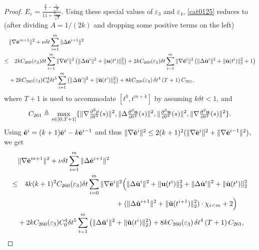\documentclass{article}
\theoremstyle{definition}                   %
\begin{document}
\begin{proof}
$E_\varepsilon= \frac{\frac{3}{4}-\frac{1}{\sqrt{2}}}{11+\frac{\nu_{\max}}{\sqrt{2}}}$.
Using these special values of $\varepsilon_3$ and $\varepsilon_4$, \eqref{cat0125} reduces to (after dividing $A=1/(2k)$ and dropping some positive terms on the left) 
\begin{align}
& \|\nabla\bar{\bf{e}}^{m+1}\|^2 
+ \nu\delta t \sum_{i=1}^m \|\Delta\bar{\bf{e}}^{i+1}\|^2
\notag\\
\le & \quad 2kC_{260}(\varepsilon_3) \delta t 
\sum_{i=1}^m \|\nabla\bar{\bf{e}}^i\|^2 
\left(\|\Delta\bar{\bf{u}}^i\|^2 + \|{\bf{u}}(t^i)\|^2_2 \right) 
+ 2k C_{260}(\varepsilon_3) \delta t 
\sum_{i=1}^m \|\nabla\tilde{\bf{e}}^i\|^2 
\left(\|\Delta\hat{\bf{u}}^i\|^2 + \|\hat{\bf{u}}(t^i)\|^2_2 + 1\right)
\notag\\
&+ 2k C_{260}(\varepsilon_3) C^4_0 \delta t^5 
\sum_{i=1}^m \left(\|\Delta\hat{\bf{u}}^i\|^2 + \|\hat{\bf{u}}(t^i)\|_2^2 \right) 
+ 8 k C_{260}(\varepsilon_3)\, \delta t^4 \,
(T+1)\,  C_{261},
\label{cat0126}
\end{align}
where $T+1$ is used to accommodate $[t^0, t^{m+k}]$ by assuming $k\delta t<1$, and 
\begin{align}
C_{261}\triangleq \max_{s\in [0,T+1]}\{
\|\nabla \tfrac{\partial^2 p}{\partial t^2}(s)\|^2,
\|\Delta \tfrac{\partial^2 \bf{u}}{\partial t^2}(s)\|^2, 
\|\tfrac{\partial^3 \bf{u}}{\partial t^3}(s)\|^2, 
\|\nabla \tfrac{\partial^2 \bf{u}}{\partial t^2}(s)\|^2\}.
\label{def_C261}
\end{align}
Using 
$\tilde{\bf e}^i=(k+1)\bar{\bf e}^i - k \bar{\bf e}^{i-1}$ and thus 
$\|\nabla\tilde{\bf{e}}^i\|^2 \le 2(k+1)^2 ( 
\|\nabla\bar{\bf{e}}^i\|^2 + \|\nabla\bar{\bf{e}}^{i-1}\|^2)$, 
we get
\begin{align}
& \|\nabla\bar{\bf{e}}^{m+1}\|^2 
+ \nu\delta t \sum_{i=1}^m \|\Delta\bar{\bf{e}}^{i+1}\|^2
\notag\\
\le & \quad 4k(k+1)^2
C_{260}(\varepsilon_3) \delta t 
\sum_{i=0}^m \|\nabla\bar{\bf{e}}^i\|^2 
\Bigl(
\|\Delta\bar{\bf{u}}^i\|^2 + \|{\bf{u}}(t^i)\|^2_2 
+ \|\Delta\hat{\bf{u}}^i\|^2 + \|\hat{\bf{u}}(t^i)\|^2_2 
\notag\\
&\qquad\qquad\qquad\qquad\qquad\qquad\qquad
 +  (\|\Delta\hat{\bf{u}}^{i+1}\|^2 + \|\hat{\bf{u}}(t^{i+1})\|^2_2) \cdot \chi_{i<m}   +2
\Bigr) 
\notag\\
&+ 2k C_{260}(\varepsilon_3) C^4_0 \delta t^5 
\sum_{i=1}^m \left(\|\Delta\hat{\bf{u}}^i\|^2 + \|\hat{\bf{u}}(t^i)\|_2^2 \right) 
+ 8 k C_{260}(\varepsilon_3)\, \delta t^4 \,
(T+1)\,  C_{261},
\label{cat0127}
\end{align}

\end{proof}
\end{document}
